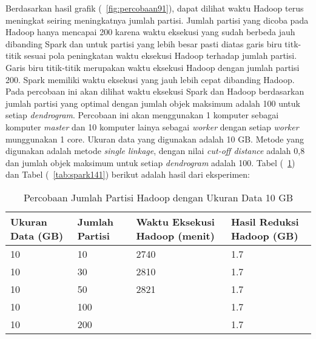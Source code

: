 Berdasarkan hasil grafik (~\ref{fig:percobaan91}), dapat dilihat waktu Hadoop terus meningkat seiring meningkatnya jumlah partisi. Jumlah partisi yang dicoba pada Hadoop hanya mencapai 200 karena waktu eksekusi yang sudah berbeda jauh dibanding Spark dan untuk partisi yang lebih besar pasti diatas garis biru titk-titik sesuai pola peningkatan waktu eksekusi Hadoop terhadap jumlah partisi. Garis biru titik-titik merupakan waktu eksekusi Hadoop dengan jumlah partisi 200. Spark memiliki waktu eksekusi yang jauh lebih cepat dibanding Hadoop.  \\



Pada percobaan ini akan dilihat waktu eksekusi Spark dan Hadoop berdasarkan jumlah partisi yang optimal dengan jumlah objek maksimum adalah 100 untuk setiap \textit{dendrogram}. Percobaan ini akan menggunakan 1 komputer sebagai komputer \textit{master} dan 10 komputer lainya sebagai \textit{worker} dengan setiap \textit{worker} munggunakan 1 core. Ukuran data yang digunakan adalah 10 GB. Metode yang digunakan adalah metode \textit{single linkage}, dengan nilai \textit{cut-off distance} adalah 0,8 dan jumlah objek maksimum untuk setiap \textit{dendrogram} adalah 100. Tabel (~\ref{tab:spark131}) dan Tabel (~\ref{tab:spark141}) berikut adalah hasil dari eksperimen:





\begin{table}[H] 
	\centering 
	\caption{Percobaan Jumlah Partisi Hadoop dengan Ukuran Data 10 GB}
	\label{tab:spark131}
	\begin{tabular}{|p{3cm}|p{3cm}|p{4cm}|p{4cm}|}
\hline
Ukuran Data (GB) & Jumlah Partisi &  Waktu Eksekusi Hadoop (menit) & Hasil Reduksi Hadoop (GB)\\
\hline
10 & 10 & 2740  & 1.7  \\
\hline
10 & 30 & 2810  & 1.7  \\
\hline
10 & 50 & 2821  & 1.7   \\
\hline
10 & 100 &   & 1.7   \\
\hline
10 & 200 &   & 1.7   \\
\hline


\hline

	\end{tabular} 
\end{table}




